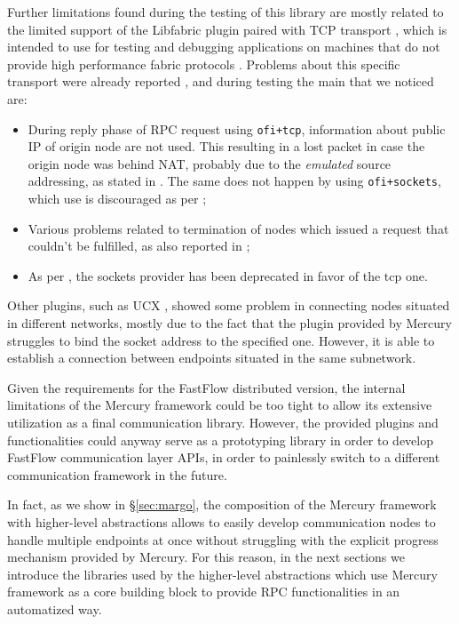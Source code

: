 Further limitations found during the testing of this library are mostly related to the limited support of the Libfabric plugin paired with TCP transport \cite{mercury_plugins}, which is intended to use for testing and debugging applications on machines that do not provide high performance fabric protocols \cite{ofi_tcp}. Problems about this specific transport were already reported \cite{ofi_tcp, git_mercury_tcp, git_mercury_tcp332}, and during testing the main that we noticed are:
\begin{itemize}
    \item During reply phase of RPC request using \texttt{ofi+tcp}, information about public IP of origin node are not used. This resulting in a lost packet in case the origin node was behind NAT, probably due to the \textit{emulated} source addressing, as stated in \cite{ofi_plugin}. The same does not happen by using \texttt{ofi+sockets}, which use is discouraged as per \cite{mercury_plugins};
    \item Various problems related to termination of nodes which issued a request that couldn't be fulfilled, as also reported in \cite{git_mercury_tcp};
    \item As per \cite{libfabric-github}, the sockets provider has been deprecated in favor of the tcp one. 
\end{itemize}

Other plugins, such as UCX \cite{ucx_plugin}, showed some problem in connecting nodes situated in different networks, mostly due to the fact that the plugin provided by Mercury struggles to bind the socket address to the specified one. However, it is able to establish a connection between endpoints situated in the same subnetwork.\newline

Given the requirements for the FastFlow distributed version, the internal limitations of the Mercury framework could be too tight to allow its extensive utilization as a final communication library. However, the provided plugins and functionalities could anyway serve as a prototyping library in order to develop FastFlow communication layer APIs, in order to painlessly switch to a different communication framework in the future.\newline

In fact, as we show in \S\ref{sec:margo}, the composition of the Mercury framework with higher-level abstractions allows to easily develop communication nodes to handle multiple endpoints at once without struggling with the explicit progress mechanism provided by Mercury. For this reason, in the next sections we introduce the libraries used by the higher-level abstractions which use Mercury framework as a core building block to provide RPC functionalities in an automatized way.

